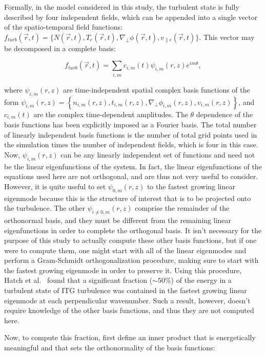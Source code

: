 \documentclass[showpacs,preprintnumbers,amsmath,amssymb,superscriptaddress,aip]{revtex4-1}
\def\beq{\begin{equation}}
\def\eeq{\end{equation}}
\def\grad{\nabla}
\newcommand{\gradperp}{\grad_\perp}
\newcommand{\vpe}{v_{\parallel e}}
\begin{document}
Formally, in the model considered in this study, the turbulent state is fully described by four independent fields, which can be appended into a single vector of the spatio-temporal field functions: 
$f_{turb}(\vec{r},t) = \{N(\vec{r},t),T_e(\vec{r},t),\gradperp \phi(\vec{r},t), \vpe(\vec{r},t)\}$. This vector may be decomposed in a complete basis:

\beq
\label{basis_decomp}
f_{turb}(\vec{r},t) = \sum_{i,m} c_{i,m}(t) \psi_{i,m}(r,z) e^{i m \theta},
\eeq

where $\psi_{i,m}(r,z)$ are time-independent spatial complex basis functions of the form $\psi_{i,m}(r,z) = \left\{ n_{i,m}(r,z),t_{i,m}(r,z),\gradperp \phi_{i,m}(r,z), v_{i,m}(r,z) \right\}$,
and $c_{i,m}(t)$ are the complex time-dependent amplitudes. The $\theta$ dependence of the basis functions has been explicitly imposed as a Fourier basis. The total number of
linearly independent basis functions is the number of total grid points used in the simulation times the number of independent fields, which is four in this case.
Now, $\psi_{i,m}(r,z)$ can be any linearly independent set of functions and need not be the linear eigenfunctions
of the system. In fact, the linear eigenfunctions of the equations used here are not orthogonal, and are thus not very useful to consider. 
However, it is quite useful to set $\psi_{0,m}(r,z)$ to the fastest
growing linear eigenmode because this is the structure of interest that is to be projected onto the turbulence. 
The other $\psi_{i \ne 0,m}(r,z)$ comprise the remainder of the orthonormal basis, and they must be different from
the remaining linear eigenfunctions in order to complete the orthogonal basis. It isn't necessary for the purpose of this study to actually compute these other basis functions, but if one were to compute
them, one might start with all of the linear eigenmodes
and perform a Gram-Schmidt orthogonalization procedure, making sure to start with the fastest growing eigenmode in order to preserve it. Using this procedure, Hatch et al.~\cite{hatch2011}
found that a significant fraction ($\sim 50\%$) of the energy in a turbulent state of ITG turbulence was contained in the fastest growing linear eigenmode at each perpendicular wavenumber.
Such a result, however, doesn't require knowledge of the other basis functions, and thus they are not computed here.

Now, to compute this fraction, first define an inner product that is energetically meaningful and that sets the orthonormality of the basis functions:
\end{document}
